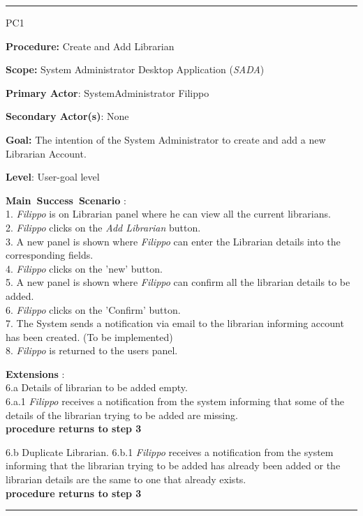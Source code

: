 
\vspace{0.5cm}
\hrule
\begin{lyxlist}{PC1}
\small{
\item [\textbf{Procedure:}] Create and Add Librarian
\item [\textbf{Scope:}] System Administrator Desktop Application (\emph{SADA})
\item [\textbf{Primary Actor}:] SystemAdministrator Filippo
\item [\textbf{Secondary Actor(s)}:] None
\item [\textbf{Goal:}] The intention of the System Administrator to create and
add a new Librarian Account.
\item [\textbf{Level}:] User-goal level
\item [\textbf{Main~Success~Scenario}]:\\
1. \emph{Filippo} is on Librarian panel where he can view all the current
librarians.
\\
2. \emph{Filippo} clicks on the \emph{Add Librarian} button. \\
3. A new panel is shown where \emph{Filippo} can enter the Librarian details
into the corresponding fields.
\\
4. \emph{Filippo} clicks on the 'new' button. \\
5. A new panel is shown where \emph{Filippo} can confirm all the librarian
details to be added.\\
6. \emph{Filippo} clicks on the 'Confirm' button. \\
7. The System sends a notification via email to the librarian
informing account has been created. (To be implemented)
\\
8. \emph{Filippo} is returned to the users panel. \\



\item [\textbf{Extensions}]: \\
6.a Details of librarian to be added empty.\\
\hspace*{0.5cm} 6.a.1 \emph{Filippo} receives a notification from
the system informing that some of the details of the librarian trying to be
added are missing. \\
\hspace*{0.5cm} \textbf{procedure returns to step 3}

6.b Duplicate Librarian.
\hspace*{0.5cm} 6.b.1 \emph{Filippo} receives a notification from
the system informing that the librarian trying to be added has already been
added or the librarian details are the same to one that already exists.\\
\hspace*{0.5cm} \textbf{procedure returns to step 3}}

\end{lyxlist}
\hrule


